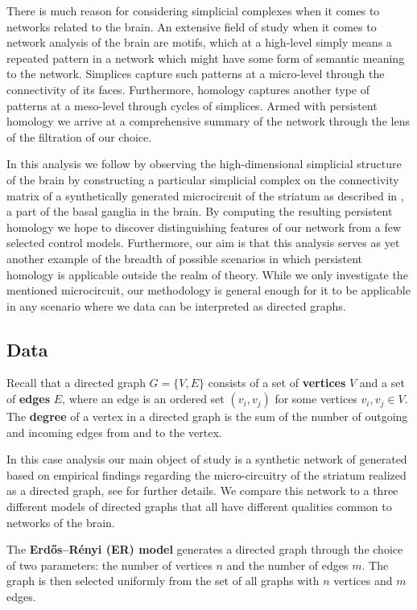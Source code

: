 There is much reason for considering simplicial complexes when it comes to networks related to the brain. An extensive field of study when it comes to network analysis of the brain are motifs, which at a high-level simply means a repeated pattern in a network which might have some form of semantic meaning to the network. Simplices capture such patterns at a micro-level through the connectivity of its faces. Furthermore, homology captures another type of patterns at a meso-level through cycles of simplices. Armed with persistent homology we arrive at a comprehensive summary of the network through the lens of the filtration of our choice.

In this analysis we follow \cite{reimann} by observing the high-dimensional simplicial structure of the brain by constructing a particular simplicial complex on the connectivity matrix of a synthetically generated microcircuit of the striatum as described in \cite{Hjorth202000671}, a part of the basal ganglia in the brain. By computing the resulting persistent homology we hope to discover distinguishing features of our network from a few selected control models. Furthermore, our aim is that this analysis serves as yet another example of the breadth of possible scenarios in which persistent homology is applicable outside the realm of theory. While we only investigate the mentioned microcircuit, our methodology is general enough for it to be applicable in any scenario where we data can be interpreted as directed graphs.

\subsection{Data}

Recall that a directed graph $G=\{V,E\}$ consists of a set of \textbf{vertices} $V$ and a set of \textbf{edges} $E$, where an edge is an ordered set $(v_{i},v_{j})$ for some vertices $v_{i},v_{j} \in V$. The \textbf{degree} of a vertex in a directed graph is the sum of the number of outgoing and incoming edges from and to the vertex.


In this case analysis our main object of study is a synthetic network of generated based on empirical findings regarding the micro-circuitry of the striatum realized as a directed graph, see \cite{Hjorth202000671} for further details. We compare this network to a three different models of directed graphs that all have different qualities common to networks of the brain.

\begin{definition}
The \textbf{Erdős–Rényi (ER) model} generates a directed graph through the choice of two parameters: the number of vertices $n$ and the number of edges $m$. The graph is then selected uniformly from the set of all graphs with $n$ vertices and $m$ edges.
\end{definition}

